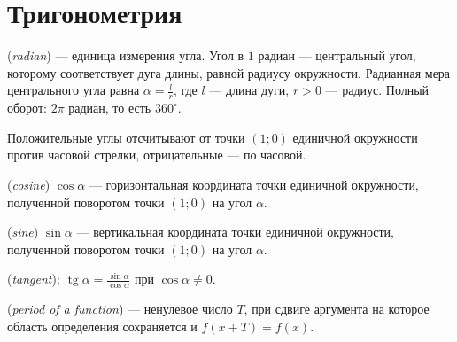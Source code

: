 \chapter{Тригонометрия}\label{chap:c15}
\begin{definition} (\emph{radian}) — единица измерения угла. Угол в \(1\) радиан — центральный угол, которому соответствует дуга длины, равной радиусу окружности. Радианная мера центрального угла равна \(\alpha=\frac{l}{r}\), где \(l\) — длина дуги, \(r>0\) — радиус. Полный оборот: \(2\pi\) радиан, то есть \(360^\circ\).\end{definition}
Положительные углы отсчитывают от точки \((1;0)\) единичной окружности против часовой стрелки, отрицательные — по часовой.
\begin{definition} (\emph{cosine}) \(\cos\alpha\) — горизонтальная координата точки единичной окружности, полученной поворотом точки \((1;0)\) на угол \(\alpha\).\end{definition}
\begin{definition} (\emph{sine}) \(\sin\alpha\) — вертикальная координата точки единичной окружности, полученной поворотом точки \((1;0)\) на угол \(\alpha\).\end{definition}
\begin{definition} (\emph{tangent}): \(\operatorname{tg}  \alpha  = \frac{\sin  \alpha }{\cos  \alpha }\) при \(\cos  \alpha  \ne  0\).\end{definition}
\begin{definition} (\emph{period of a function}) — ненулевое число \(T\), при сдвиге аргумента на которое область определения сохраняется и \(f (x + T) = f (x)\).\end{definition}
